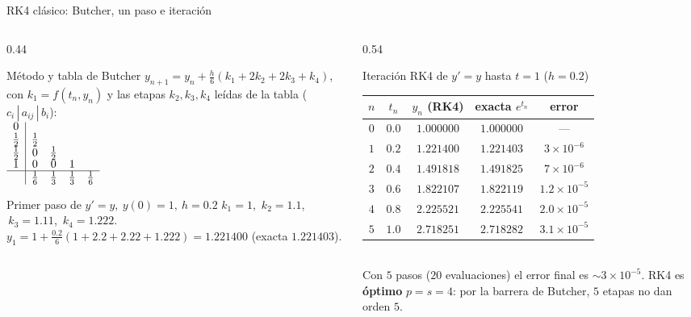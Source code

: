 \documentclass[aspectratio=169,10pt]{beamer}
\begin{document}
\begin{frame}{RK4 clásico: Butcher, un paso e iteración}
\begin{columns}[T]
\begin{column}{0.44\textwidth}
\begin{cardidea}{Método y tabla de Butcher}{\faSuperscript}
{\footnotesize $y_{n+1}=y_n+\tfrac{h}{6}(k_1+2k_2+2k_3+k_4)$, con $k_1=f(t_n,y_n)$ y las etapas $k_2,k_3,k_4$ leídas de la tabla ($c_i\,|\,a_{ij}\,|\,b_i$):\\[0.6mm]
\centering$\renewcommand{\arraystretch}{0.8}\begin{array}{c|cccc}
0 & & & & \\ \tfrac12 & \tfrac12 & & & \\
\tfrac12 & 0 & \tfrac12 & & \\ 1 & 0 & 0 & 1 & \\ \hline
& \tfrac16 & \tfrac13 & \tfrac13 & \tfrac16 \end{array}$}
\end{cardidea}
\vspace{-0.4mm}
\begin{cardgear}{Primer paso de $y'=y,\ y(0)=1,\ h=0.2$}{\faCalculator}
{\footnotesize $k_1{=}1$, $\,k_2{=}1.1$, $\,k_3{=}1.11$, $\,k_4{=}1.222$.\\[0.2mm]
$y_1=1+\tfrac{0.2}{6}(1{+}2.2{+}2.22{+}1.222)=1.221400$ (exacta $1.221403$).}
\end{cardgear}
\end{column}
\begin{column}{0.54\textwidth}
\begin{cardgear}{Iteración RK4 de $y'=y$ hasta $t=1$ ($h=0.2$)}{\faTable}
\centering
{\footnotesize\renewcommand{\arraystretch}{1.05}\setlength{\tabcolsep}{6pt}
\begin{tabular}{c|c|c|c|c}
$n$ & $t_n$ & $y_n$ (RK4) & exacta $e^{t_n}$ & error\\\hline
$0$ & $0.0$ & $1.000000$ & $1.000000$ & —\\
$1$ & $0.2$ & $1.221400$ & $1.221403$ & $3{\times}10^{-6}$\\
$2$ & $0.4$ & $1.491818$ & $1.491825$ & $7{\times}10^{-6}$\\
$3$ & $0.6$ & $1.822107$ & $1.822119$ & $1.2{\times}10^{-5}$\\
$4$ & $0.8$ & $2.225521$ & $2.225541$ & $2.0{\times}10^{-5}$\\
$5$ & $1.0$ & $2.718251$ & $2.718282$ & $3.1{\times}10^{-5}$\\
\end{tabular}}\\[1.2mm]
{\footnotesize Con $5$ pasos ($20$ evaluaciones) el error final es $\sim3{\times}10^{-5}$. RK4 es \textbf{óptimo} $p=s=4$: por la barrera de Butcher, $5$ etapas no dan orden $5$.}
\end{cardgear}
\end{column}
\end{columns}
\end{frame}
\end{document}

